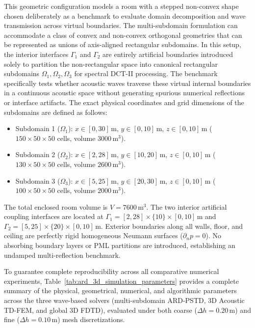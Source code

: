 \documentclass{Configuration_Files/PoliMi3i_thesis}
\newif\ifshowthesischanges
\DeclareRobustCommand{\thesischange}[2]{%
    \ifshowthesischanges
        \textcolor{#1}{#2}%
    \else
        #2%
    \fi
}
\def\thesischange#1#2{#2}%
\begin{document}
\thesischange{red}{This geometric configuration models a room with a stepped non-convex shape chosen deliberately as a benchmark to evaluate domain decomposition and wave transmission across virtual boundaries. The multi-subdomain formulation can accommodate a class of convex and non-convex orthogonal geometries that can be represented as unions of axis-aligned rectangular subdomains. In this setup, the interior interfaces $\Gamma_1$ and $\Gamma_2$ are entirely artificial boundaries introduced solely to partition the non-rectangular space into canonical rectangular subdomains $\Omega_1, \Omega_2, \Omega_3$ for spectral DCT-II processing. The benchmark specifically tests whether acoustic waves traverse these virtual internal boundaries in a continuous acoustic space without generating spurious numerical reflections or interface artifacts. The exact physical coordinates and grid dimensions of the subdomains are defined as follows:}
\begin{itemize}
    \item \thesischange{red}{Subdomain 1 ($\Omega_1$): $x \in [0, 30]$\,m, $y \in [0, 10]$\,m, $z \in [0, 10]$\,m ($150 \times 50 \times 50$ cells, volume $3000$\,m$^3$).}
    \item \thesischange{red}{Subdomain 2 ($\Omega_2$): $x \in [2, 28]$\,m, $y \in [10, 20]$\,m, $z \in [0, 10]$\,m ($130 \times 50 \times 50$ cells, volume $2600$\,m$^3$).}
    \item \thesischange{red}{Subdomain 3 ($\Omega_3$): $x \in [5, 25]$\,m, $y \in [20, 30]$\,m, $z \in [0, 10]$\,m ($100 \times 50 \times 50$ cells, volume $2000$\,m$^3$).}
\end{itemize}
\thesischange{red}{The total enclosed room volume is $V = 7600$\,m$^3$. The two interior artificial coupling interfaces are located at $\Gamma_1 = [2, 28] \times \{10\} \times [0, 10]$\,m and $\Gamma_2 = [5, 25] \times \{20\} \times [0, 10]$\,m. Exterior boundaries along all walls, floor, and ceiling are perfectly rigid homogeneous Neumann surfaces ($\partial_n p = 0$). No absorbing boundary layers or PML partitions are introduced, establishing an undamped multi-reflection benchmark.}

\thesischange{red}{To guarantee complete reproducibility across all comparative numerical experiments, Table~\ref{tab:ard_3d_simulation_parameters} provides a complete summary of the physical, geometrical, numerical, and algorithmic parameters across the three wave-based solvers (multi-subdomain ARD-PSTD, 3D Acoustic TD-FEM, and global 3D FDTD), evaluated under both coarse ($\Delta h = 0.20$\,m) and fine ($\Delta h = 0.10$\,m) mesh discretizations.}
\end{document}
